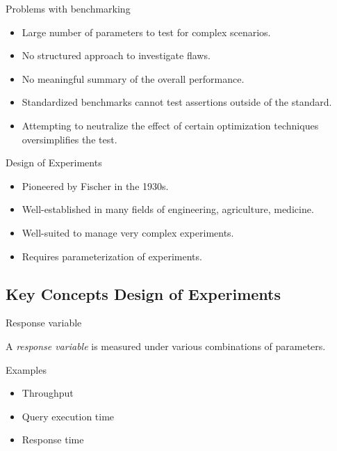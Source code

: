 \documentclass[english,handout,aspectratio=169]{ifislide}
\begin{document}
\begin{frame}{Problems with benchmarking}

\begin{itemize}
\item Large number of parameters to test for complex scenarios.
\item No structured approach to investigate flaws.
\item No meaningful summary of the overall performance.
\item Standardized benchmarks cannot test assertions outside of the
  standard.
\item Attempting to neutralize the effect of certain optimization
  techniques oversimplifies the test.
\end{itemize}
\end{frame}

\begin{frame}{Design of Experiments}

  \begin{itemize}
  \item Pioneered by Fischer in the 1930s.
  \item Well-established in many fields of engineering, agriculture,
    medicine.
  \item Well-suited to manage very complex experiments.
  \item Requires parameterization of experiments.
  \end{itemize}
\end{frame}

\subsection{Key Concepts Design of Experiments}

\begin{frame}{Response variable}

 \Large
   A \emph{response variable} is measured under various
    combinations of parameters.
 \normalsize
      

    \begin{block}{Examples}
      \begin{itemize}
      \item Throughput
      \item Query execution time
      \item Response time
      \end{itemize}
    \end{block}

\end{frame}
\end{document}

